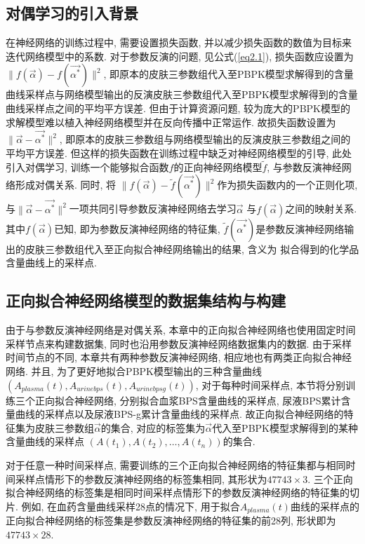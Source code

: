 \documentclass[a4paper,punct=banjiao,twoside]{ctexrep}
\theoremstyle{plain}
\theoremstyle{definition}
\theoremstyle{remark}
\begin{document}
\subsection*{对偶学习的引入背景}
在神经网络的训练过程中, 需要设置损失函数, 并以减少损失函数的数值为目标来迭代网络模型中的系数. 对于参数反演的问题, 见公式(\ref{eq2.1}), 损失函数应设置为$\|f(\vec{\alpha})-f(\vec{\alpha^*}) \|^2 $, 即原本的皮肤三参数组代入至PBPK模型求解得到的含量曲线采样点与网络模型输出的反演皮肤三参数组代入至PBPK模型求解得到的含量曲线采样点之间的平均平方误差. 但由于计算资源问题, 较为庞大的PBPK模型的求解模型难以植入神经网络模型并在反向传播中正常运作. 故损失函数设置为 $\|\vec{\alpha}-\vec{\alpha^*} \|^2 $, 即原本的皮肤三参数组与网络模型输出的反演皮肤三参数组之间的平均平方误差.
但这样的损失函数在训练过程中缺乏对神经网络模型的引导, 此处引入对偶学习, 训练一个能够拟合函数$f$的正向神经网络模型$\tilde{f}$, 与参数反演神经网络形成对偶关系. 同时, 将
$\|f(\vec{\alpha})-\tilde{f}(\vec{\alpha^*}) \|^2 $作为损失函数内的一个正则化项, 与$\|\vec{\alpha}-\vec{\alpha^*} \|^2 $一项共同引导参数反演神经网络去学习$\vec{\alpha}$
与$f(\vec{\alpha})$之间的映射关系. 其中$f(\vec{\alpha})$已知, 即为参数反演神经网络的特征集, $\tilde{f}(\vec{\alpha^*})$是参数反演神经网络输出的皮肤三参数组代入至正向拟合神经网络输出的结果, 含义为
拟合得到的化学品含量曲线上的采样点.

\subsection*{正向拟合神经网络模型的数据集结构与构建}
\label{3.5.2}
由于与参数反演神经网络是对偶关系, 本章中的正向拟合神经网络也使用固定时间采样节点来构建数据集, 同时也沿用参数反演神经网络数据集内的数据. 由于采样时间节点的不同, 本章共有两种参数反演神经网络, 相应地也有两类正向拟合神经网络.
并且, 为了更好地拟合PBPK模型输出的三种含量曲线$(A_{plasma}(t), A_{urinebps}(t), A_{urinebpsg}(t))$, 对于每种时间采样点, 本节将分别训练三个正向拟合神经网络, 分别拟合血浆BPS含量曲线的采样点,
尿液BPS累计含量曲线的采样点以及尿液BPS-g累计含量曲线的采样点. 故正向拟合神经网络的特征集为皮肤三参数组$\vec{\alpha}$的集合, 对应的标签集为$\vec{\alpha}$代入至PBPK模型求解得到的某种含量曲线的采样点 $(A(t_1),A(t_2),\dots,A(t_n))$的集合.

对于任意一种时间采样点, 需要训练的三个正向拟合神经网络的特征集都与相同时间采样点情形下的参数反演神经网络的标签集相同, 其形状为$47743 \times 3$.
三个正向拟合神经网络的标签集是相同时间采样点情形下的参数反演神经网络的特征集的切片. 例如, 在血药含量曲线采样28点的情况下, 用于拟合$A_{plasma}(t)$曲线的采样点的正向拟合神经网络的标签集是参数反演神经网络的特征集的前28列, 形状即为$47743 \times 28$.
\end{document}
